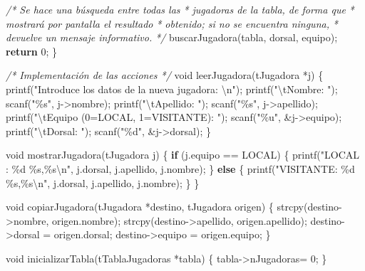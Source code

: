\documentclass[
]{book}
\newenvironment{Shaded}{\begin{snugshade}}{\end{snugshade}}
\newcommand{\CommentTok}[1]{\textcolor[rgb]{0.56,0.35,0.01}{\textit{#1}}}
\newcommand{\ControlFlowTok}[1]{\textcolor[rgb]{0.13,0.29,0.53}{\textbf{#1}}}
\newcommand{\DataTypeTok}[1]{\textcolor[rgb]{0.13,0.29,0.53}{#1}}
\newcommand{\DecValTok}[1]{\textcolor[rgb]{0.00,0.00,0.81}{#1}}
\newcommand{\NormalTok}[1]{#1}
\newcommand{\SpecialCharTok}[1]{\textcolor[rgb]{0.00,0.00,0.00}{#1}}
\newcommand{\StringTok}[1]{\textcolor[rgb]{0.31,0.60,0.02}{#1}}
\begin{document}
\begin{Shaded}
\begin{Highlighting}[]
    \CommentTok{/* Se hace una búsqueda entre todas las}
\CommentTok{     * jugadoras de la tabla, de forma que}
\CommentTok{     * mostrará por pantalla el resultado}
\CommentTok{     * obtenido; si no se encuentra ninguna,}
\CommentTok{     * devuelve un mensaje informativo.}
\CommentTok{     */}
\NormalTok{    buscarJugadora(tabla, dorsal, equipo);}
    \ControlFlowTok{return} \DecValTok{0}\NormalTok{;}
\NormalTok{\}}

\CommentTok{/* Implementación de las acciones */}
\DataTypeTok{void}\NormalTok{ leerJugadora(tJugadora *j) \{}
\NormalTok{    printf(}\StringTok{"Introduce los datos de la nueva jugadora: }\SpecialCharTok{\textbackslash{}n}\StringTok{"}\NormalTok{);}
\NormalTok{    printf(}\StringTok{"}\SpecialCharTok{\textbackslash{}t}\StringTok{Nombre: "}\NormalTok{);}
\NormalTok{    scanf(}\StringTok{"\%s"}\NormalTok{, j{-}\textgreater{}nombre);}
\NormalTok{    printf(}\StringTok{"}\SpecialCharTok{\textbackslash{}t}\StringTok{Apellido: "}\NormalTok{);}
\NormalTok{    scanf(}\StringTok{"\%s"}\NormalTok{, j{-}\textgreater{}apellido);}
\NormalTok{    printf(}\StringTok{"}\SpecialCharTok{\textbackslash{}t}\StringTok{Equipo (0=LOCAL, 1=VISITANTE): "}\NormalTok{);}
\NormalTok{    scanf(}\StringTok{"\%u"}\NormalTok{, \&j{-}\textgreater{}equipo);}
\NormalTok{    printf(}\StringTok{"}\SpecialCharTok{\textbackslash{}t}\StringTok{Dorsal: "}\NormalTok{);}
\NormalTok{    scanf(}\StringTok{"\%d"}\NormalTok{, \&j{-}\textgreater{}dorsal);}
\NormalTok{\}}

\DataTypeTok{void}\NormalTok{ mostrarJugadora(tJugadora j) \{}
    \ControlFlowTok{if}\NormalTok{ (j.equipo == LOCAL) \{}
\NormalTok{        printf(}\StringTok{"LOCAL    : \%d \%s,\%s}\SpecialCharTok{\textbackslash{}n}\StringTok{"}\NormalTok{, j.dorsal, j.apellido, j.nombre);}
\NormalTok{    \} }\ControlFlowTok{else}\NormalTok{ \{}
\NormalTok{        printf(}\StringTok{"VISITANTE: \%d \%s,\%s}\SpecialCharTok{\textbackslash{}n}\StringTok{"}\NormalTok{, j.dorsal, j.apellido, j.nombre);}
\NormalTok{    \}}
\NormalTok{\}}

\DataTypeTok{void}\NormalTok{ copiarJugadora(tJugadora *destino, tJugadora origen) \{}
\NormalTok{    strcpy(destino{-}\textgreater{}nombre, origen.nombre);}
\NormalTok{    strcpy(destino{-}\textgreater{}apellido, origen.apellido);}
\NormalTok{    destino{-}\textgreater{}dorsal = origen.dorsal;}
\NormalTok{    destino{-}\textgreater{}equipo = origen.equipo;}
\NormalTok{\}}

\DataTypeTok{void}\NormalTok{ inicializarTabla(tTablaJugadoras *tabla) \{    }
\NormalTok{    tabla{-}\textgreater{}nJugadoras= }\DecValTok{0}\NormalTok{;}
\NormalTok{\}}


\end{Highlighting}
\end{Shaded}
\end{document}
